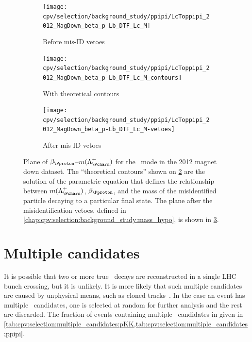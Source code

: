 \begin{figure}
  \begin{subfigure}[b]{0.5\textwidth}
    \texttt{[image: cpv/selection/background\_study/ppipi/LcToppipi\_2012\_MagDown\_beta\_p-Lb\_DTF\_Lc\_M]}
    \caption{Before mis-ID vetoes}
    \label{fig:cpv:selection:background_study:mom_asym:ppipi:before}
  \end{subfigure}
  \begin{subfigure}[b]{0.5\textwidth}
    \texttt{[image: cpv/selection/background\_study/ppipi/LcToppipi\_2012\_MagDown\_beta\_p-Lb\_DTF\_Lc\_M\_contours]}
    \caption{With theoretical contours}
    \label{fig:cpv:selection:background_study:mom_asym:ppipi:contours}
  \end{subfigure}
  \begin{subfigure}[b]{0.5\textwidth}
    \texttt{[image: cpv/selection/background\_study/ppipi/LcToppipi\_2012\_MagDown\_beta\_p-Lb\_DTF\_Lc\_M-vetoes]}
    \caption{After mis-ID vetoes}
    \label{fig:cpv:selection:background_study:mom_asym:ppipi:after}
  \end{subfigure}
  \caption{%
    Plane of $\beta_{\Pproton}$--$m(\PLambdac)$ for the \ppipi\ mode in the 
    2012 magnet down dataset.
    The ``theoretical contours'' shown on 
    \cref{fig:cpv:selection:background_study:mom_asym:ppipi:contours} are the 
    solution of the parametric equation that defines the relationship between 
    $m(\PLambdac)$, $\beta_{\Pproton}$, and the mass of the misidentified 
    particle decaying to a particular final state.
    The plane after the misidentification vetoes, defined in 
    \cref{chap:cpv:selection:background_study:mass_hypo}, is shown in 
    \cref{fig:cpv:selection:background_study:mom_asym:ppipi:after}.
  }
  \label{fig:cpv:selection:background_study:mom_asym:ppipi}
\end{figure}

\section{Multiple candidates}
\label{chap:cpv:selection:multiple_candidates}

It is possible that two or more true \LcTophh\ decays are reconstructed in a 
single \ac{LHC} bunch crossing, but it is unlikely.
It is more likely that such multiple candidates are caused by unphysical means, 
such as cloned tracks~\cite{LHCb-INT-2011-009}.
In the case an event has multiple \PLambdac\ candidates, one is selected at 
random for further analysis and the rest are discarded.
The fraction of events containing multiple \PLambdac\ candidates in given in 
\cref{tab:cpv:selection:multiple_candidates:pKK,tab:cpv:selection:multiple_candidates:ppipi}.

